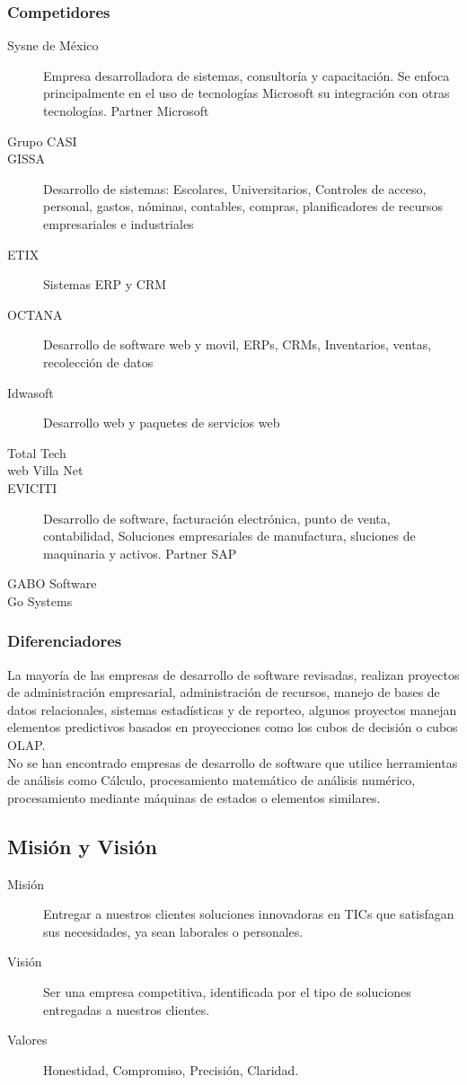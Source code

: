 \documentclass[12pt,spanish,lettersize]{article}
\begin{document}
\subsubsection{Competidores}
\begin{description}
\item[Sysne de M\'exico] Empresa desarrolladora de sistemas, consultor\'ia y capacitaci\'on. Se enfoca principalmente en el uso de tecnolog\'ias Microsoft  su integraci\'on con otras tecnolog\'ias. Partner Microsoft
\item[Grupo CASI]
\item[GISSA] Desarrollo de sistemas: Escolares, Universitarios, Controles de acceso, personal, gastos, n\'ominas, contables, compras, planificadores de recursos empresariales e industriales
\item[ETIX] Sistemas ERP y CRM
\item[OCTANA] Desarrollo de software web y movil, ERPs, CRMs, Inventarios, ventas, recolecci\'on de datos
\item[Idwasoft] Desarrollo web y paquetes de servicios web
\item[Total Tech]
\item[web Villa Net]
\item[EVICITI] Desarrollo de software, facturaci\'on electr\'onica, punto de venta, contabilidad, Soluciones empresariales de manufactura, sluciones de maquinaria y activos. Partner SAP
\item[GABO Software]
\item[Go Systems]
\end{description}
\subsubsection{Diferenciadores}
La mayor\'ia de las empresas de desarrollo de software revisadas, realizan proyectos de administraci\'on empresarial, administraci\'on de recursos, manejo de bases de datos relacionales, sistemas estad\'isticas y de reporteo, algunos proyectos manejan elementos predictivos basados en proyecciones como los cubos de decisi\'on o cubos OLAP.\\
No se han encontrado empresas de desarrollo de software que utilice herramientas de an\'alisis como C\'alculo, procesamiento matem\'atico de an\'alisis num\'erico, procesamiento mediante m\'aquinas de estados o elementos similares.
\subsection{Misi\'on y Visi\'on}
\begin{description}
\item[Misi\'on]
Entregar a nuestros clientes soluciones innovadoras en TICs que satisfagan sus necesidades, ya sean laborales o personales.
\item[Visi\'on]
Ser una empresa competitiva, identificada por el tipo de soluciones entregadas a nuestros clientes.
\item[Valores]
Honestidad, Compromiso, Precisi\'on, Claridad.
\end{description}
\end{document}
